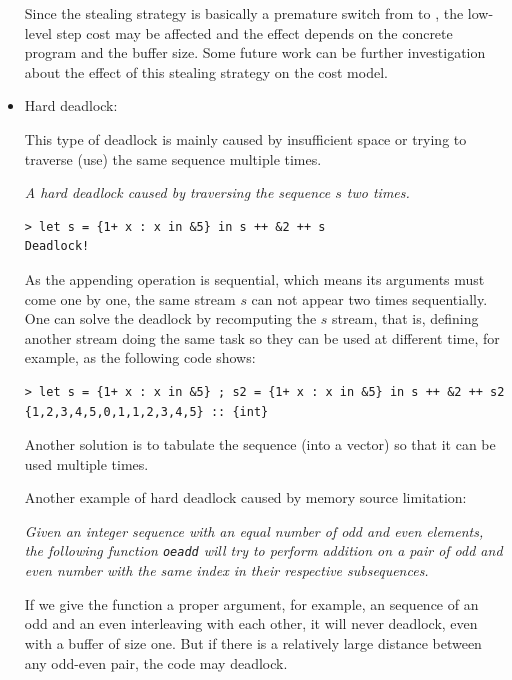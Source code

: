 \begin{itemize}
Since the stealing strategy is basically a premature
switch from \filling to \draining, the low-level step cost may be affected and the effect depends on the concrete program and the buffer size. 
Some future work can be further investigation about the effect of this stealing strategy on the cost model.\\


\item Hard deadlock: 

This type of deadlock is mainly caused by insufficient space or trying to traverse (use) the same sequence multiple times. 

\begin{example} \emph{A hard deadlock caused by traversing the sequence $s$ two times.} \label{eg:deadlock1}
\end{example}
\begin{lstlisting}[style=nesl-style]
> let s = {1+ x : x in &5} in s ++ &2 ++ s
Deadlock!
\end{lstlisting}
As the appending operation is sequential, which means its arguments must come one by one, the same stream $s$ can not appear two times sequentially.
One can solve the deadlock by recomputing the $s$ stream, that is, defining another stream doing the same task so they can be used at different time, for example, as the following code shows:\\
\begin{lstlisting}[style=nesl-style]
> let s = {1+ x : x in &5} ; s2 = {1+ x : x in &5} in s ++ &2 ++ s2
{1,2,3,4,5,0,1,1,2,3,4,5} :: {int}
\end{lstlisting}
Another solution is to tabulate the sequence (into a vector) so that it can be used multiple times. 

\vspace{0.5cm}
Another example of hard deadlock caused by memory source limitation:
\begin{example} \emph{Given an integer sequence with an equal number of odd and even elements, the following function \texttt{oeadd} will try to perform addition on a pair of odd and even number with the same index in their respective subsequences.} 
\end{example}

 
\hspace{0.3cm}

If we give the function a proper argument, for example, an sequence of an odd and an even interleaving with each other, it will never deadlock, even with a buffer of size one. 
But if there is a relatively large distance between any odd-even pair, the code may deadlock.  \\
  

\end{itemize}
